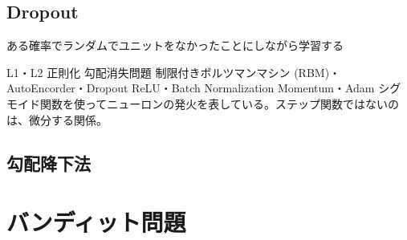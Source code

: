 \documentclass{jsarticle}
\begin{document}
\subsection{Dropout}
ある確率でランダムでユニットをなかったことにしながら学習する





L1・L2 正則化
勾配消失問題
制限付きボルツマンマシン (RBM)・AutoEncorder・Dropout
ReLU・Batch Normalization
Momentum・Adam
シグモイド関数を使ってニューロンの発火を表している。ステップ関数ではないのは、微分する関係。
\subsection{勾配降下法}


\section{バンディット問題}

\section{}
\section{}
\section{}
\section{}
\section{}
\section{}
\section{}
\section{}
\end{document}
